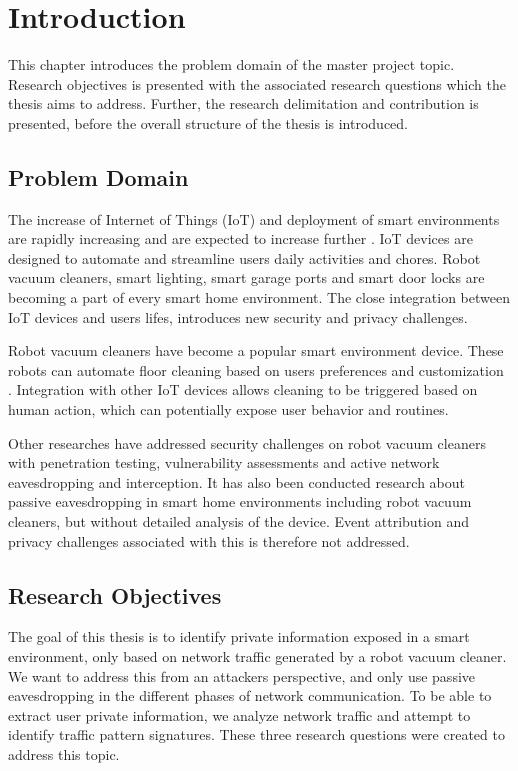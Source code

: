 \chapter{Introduction}
This chapter introduces the problem domain of the master project topic. Research objectives is presented with the associated research questions which the thesis aims to address. Further, the research delimitation and contribution is presented, before the overall structure of the thesis is introduced. 
 
\section{Problem Domain}

The increase of Internet of Things (IoT) and deployment of smart environments are rapidly increasing and are expected to increase further \cite{iotgrowth}. IoT 
devices are designed to automate and streamline users daily activities and chores. Robot vacuum cleaners, smart lighting, smart garage ports and smart door locks are becoming a part of every smart home environment. The close integration between IoT devices and users lifes, introduces new security and privacy challenges.

Robot vacuum cleaners have become a popular smart environment device. These robots can automate floor cleaning based on users preferences and customization \cite{roboticvacuumcleaner2021}. Integration with other IoT devices allows cleaning to be triggered based on human action, which can potentially expose user behavior and routines. 

Other researches have addressed security challenges on robot vacuum cleaners with penetration testing, vulnerability assessments and active network eavesdropping and interception. It has also been conducted research about passive eavesdropping in smart home environments including robot vacuum cleaners, but without detailed analysis of the device. Event attribution and privacy challenges associated with this is therefore not addressed.

\section{Research Objectives}

The goal of this thesis is to identify private information exposed in a smart environment, only based on network traffic generated by a robot vacuum cleaner. We want to address this from an attackers perspective, and only use passive eavesdropping in the different phases of network communication. To be able to extract user private information, we analyze network traffic and attempt to identify traffic pattern signatures. These three research questions were created to address this topic.

